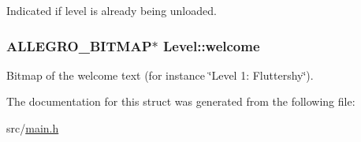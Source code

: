 Indicated if level is already being unloaded. \hypertarget{structLevel_a575fec7686bd94b5c35b15d73296c977}{
\subsubsection[{welcome}]{\setlength{\rightskip}{0pt plus 5cm}A\-L\-L\-E\-G\-R\-O\-\_\-\-B\-I\-T\-M\-A\-P$\ast$ Level\-::welcome}}\label{structLevel_a575fec7686bd94b5c35b15d73296c977}
Bitmap of the welcome text (for instance \char`\"{}\-Level 1\-: Fluttershy\char`\"{}). 

The documentation for this struct was generated from the following file\-:\begin{DoxyCompactItemize}
\item 
src/\hyperlink{main_8h}{main.\-h}\end{DoxyCompactItemize}
